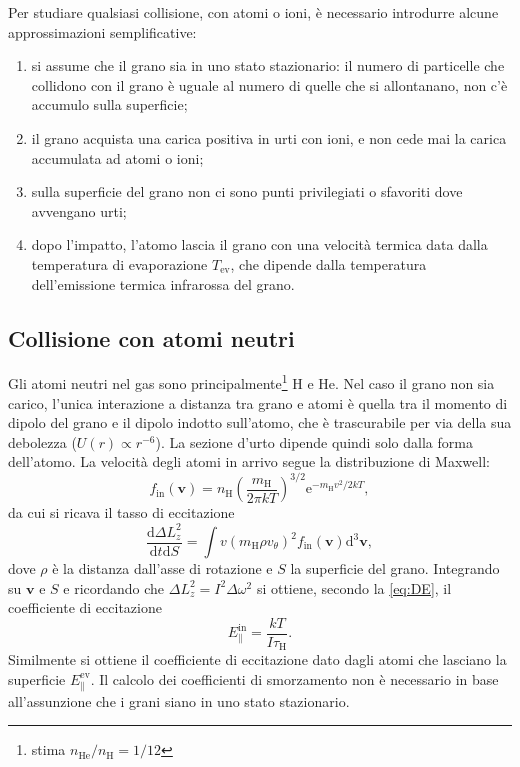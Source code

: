 Per studiare qualsiasi collisione, con atomi o ioni, è necessario introdurre alcune approssimazioni semplificative:
\begin{enumerate}
	\item si assume che il grano sia in uno stato stazionario: il numero di particelle che collidono con il grano è uguale al numero di quelle che si allontanano, non c'è accumulo sulla superficie;
	\item il grano acquista una carica positiva in urti con ioni, e non cede mai la carica accumulata ad atomi o ioni;
	\item sulla superficie del grano non ci sono punti privilegiati o sfavoriti dove avvengano urti;
	\item dopo l'impatto, l'atomo lascia il grano con una velocità termica data dalla temperatura di evaporazione $T_{\mathrm{ev}}$, che dipende dalla temperatura dell'emissione termica infrarossa del grano.
\end{enumerate}

\subsection{Collisione con atomi neutri}
Gli atomi neutri nel gas sono principalmente\footnote{\textcite{Ali} stima $n_{\mathrm{He}}/n_{\mathrm{H}} = 1/12$} H e He. Nel caso il grano non sia carico, l'unica interazione a distanza tra grano e atomi è quella tra il momento di dipolo del grano e il dipolo indotto sull'atomo, che è trascurabile per via della sua debolezza ($U(r) \propto r^{-6}$). La sezione d'urto dipende quindi solo dalla forma dell'atomo. La velocità degli atomi in arrivo segue la distribuzione di Maxwell:
\begin{equation}
f_{\mathrm{in}}(\boldsymbol{v}) = n_{\mathrm{H}} \left( \frac{m_{\mathrm{H}}}{2\pi k T} \right) ^{3/2} \mathrm{e}^{-m_{\mathrm{H}} v^2 / 2 k T},
\end{equation}
da cui si ricava il tasso di eccitazione
\begin{equation}
\frac{\mathrm{d}\Delta L_z^2}{\mathrm{d}t \mathrm{d}S} = \int v (m_{\mathrm{H}} \rho v_\theta)^2 f_{\mathrm{in}}(\boldsymbol{v})\mathrm{d}^3\boldsymbol{v},
\end{equation}
dove $\rho$ è la distanza dall'asse di rotazione e $S$ la superficie del grano.
Integrando su $\boldsymbol{v}$ e $S$ e ricordando che $\Delta L_z^2 = I^2 \Delta \omega^2$ si ottiene, secondo la \ref{eq:DE}, il coefficiente di eccitazione
\begin{equation}
E^{\mathrm{in}}_{\parallel} = \frac{kT}{I\tau_{\mathrm{H}}}.
\end{equation}
Similmente si ottiene il coefficiente di eccitazione dato dagli atomi che lasciano la superficie $E^{\mathrm{ev}}_{\parallel}$. Il calcolo dei coefficienti di smorzamento non è necessario in base all'assunzione che i grani siano in uno stato stazionario.

